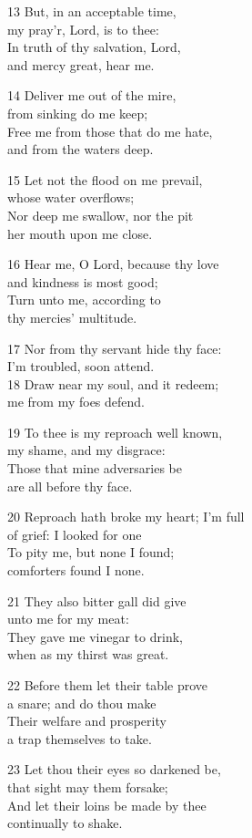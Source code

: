 \begin{multicols}{3}
13 But, in an acceptable time,\\
my pray’r, Lord, is to thee:\\
In truth of thy salvation, Lord,\\
and mercy great, hear me.

14 Deliver me out of the mire,\\
from sinking do me keep;\\
Free me from those that do me hate,\\
and from the waters deep.

15 Let not the flood on me prevail,\\
whose water overflows;\\
Nor deep me swallow, nor the pit\\
her mouth upon me close.

16 Hear me, O Lord, because thy love\\
and kindness is most good;\\
Turn unto me, according to\\
thy mercies’ multitude.

17 Nor from thy servant hide thy face:\\
I’m troubled, soon attend.\\
18 Draw near my soul, and it redeem;\\
me from my foes defend.

19 To thee is my reproach well known,\\
my shame, and my disgrace:\\
Those that mine adversaries be\\
are all before thy face.

20 Reproach hath broke my heart; I’m full\\
of grief: I looked for one\\
To pity me, but none I found;\\
comforters found I none.

21 They also bitter gall did give\\
unto me for my meat:\\
They gave me vinegar to drink,\\
when as my thirst was great.

22 Before them let their table prove\\
a snare; and do thou make\\
Their welfare and prosperity\\
a trap themselves to take.

23 Let thou their eyes so darkened be,\\
that sight may them forsake;\\
And let their loins be made by thee\\
continually to shake.


\end{multicols}
